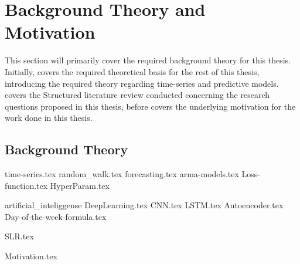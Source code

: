\chapter{Background Theory and Motivation}\label{T-B}
\label{cha:TheoryAndBackground}


This section will primarily cover the required background theory for this thesis.
Initially,  covers the required theoretical basis for the rest of this thesis,
introducing the required theory regarding time-series and predictive models.
 covers the Structured literature review conducted concerning the research questions proposed in this thesis,
before  covers the underlying motivation for the work done in this thesis.



\section{Background Theory}
\label{section:BT:BackgroundTheory}
{time-series.tex}
{random_walk.tex}
{forecasting.tex}
{arma-models.tex}
{Loss-function.tex}
{HyperParam.tex}

{artificial_inteliggense}
{DeepLearning.tex}
{CNN.tex}
{LSTM.tex}
{Autoencoder.tex}
{Day-of-the-week-formula.tex}



{SLR.tex}


{Motivation.tex}
